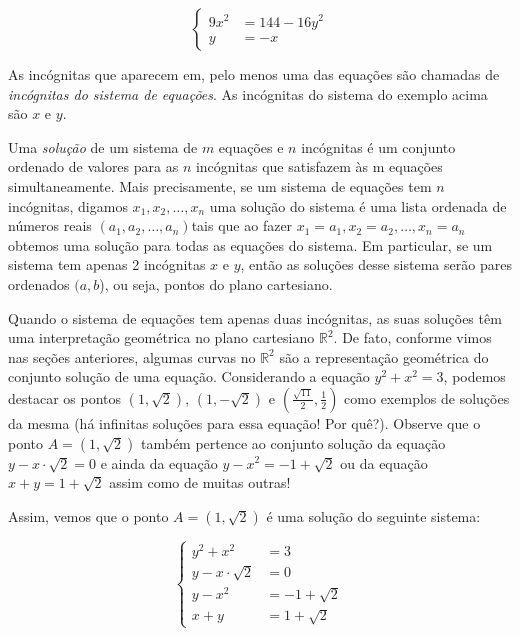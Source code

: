 \begin{equation*}
\left\{
\begin{aligned}
9x^2&=144-16y^2\\
y&=-x
\end{aligned}
\right.
\end{equation*}

As incógnitas que aparecem em, pelo menos uma das equações são chamadas de \emph{incógnitas do sistema de equações}. As incógnitas do sistema do exemplo acima são $x$ e $y$.
 
Uma \emph{solução} de um sistema de $m$ equações e $n$ incógnitas é um conjunto ordenado de valores para as $n$ incógnitas que satisfazem às m equações simultaneamente.  Mais precisamente, se um sistema de equações tem $n$ incógnitas, digamos $x_1, x_2, \ldots, x_n$ uma solução do sistema é uma lista ordenada de números reais $(a_1, a_2, \ldots, a_n)$tais que ao fazer $x_1 = a_1 , x_2 = a_2, \ldots, x_n = a_n$ obtemos uma solução para todas as equações do sistema. Em particular, se um sistema tem apenas 2 incógnitas $x$ e $y$, então as soluções desse sistema serão pares ordenados $(a,b$), ou seja, pontos do plano cartesiano.

Quando o sistema de equações tem apenas duas incógnitas, as suas soluções têm uma interpretação geométrica no plano cartesiano $\mathbb{R}^2$. De fato, conforme vimos nas seções anteriores, algumas curvas no $\mathbb{R}^2$ são a representação geométrica do conjunto solução de uma equação. Considerando a equação $y^2 + x^2 = 3$, podemos destacar os pontos $(1, \sqrt{2})$, $(1, - \sqrt{2})$ e $(\frac{\sqrt{11}}{2}, \frac{1}{2})$ como exemplos de soluções da mesma (há infinitas soluções para essa equação! Por quê?). Observe que o ponto $A = (1, \sqrt{2})$ também pertence ao conjunto solução da equação $y - x\cdot \sqrt{2} = 0$ e ainda da equação $y - x^2 = -1 + \sqrt{2}$ ou da equação $x + y = 1 + \sqrt{2}$ assim como de muitas outras!

 Assim, vemos que o ponto $A = (1, \sqrt{2})$ é uma solução do seguinte sistema:

\begin{equation*}
\left\{
\begin{aligned}
y^2+x^2&=3\\
y-x\cdot\sqrt{2}&=0\\
y-x^2&=-1+\sqrt{2}\\
x+y&=1+\sqrt{2}
\end{aligned}
\right.
\end{equation*}


